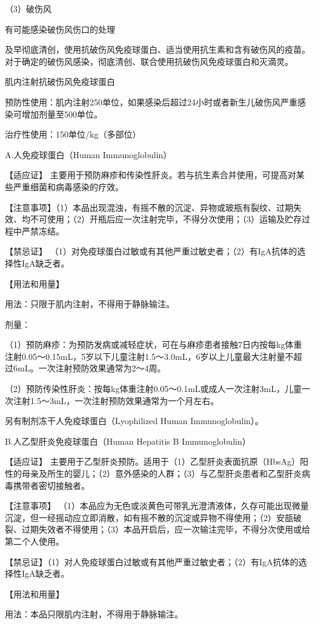 （3）破伤风

有可能感染破伤风伤口的处理

及早彻底清创，使用抗破伤风免疫球蛋白、适当使用抗生素和含有破伤风的疫苗。对于确定的破伤风感染，彻底清创、联合使用抗破伤风免疫球蛋白和灭滴灵。

肌内注射抗破伤风免疫球蛋白

预防性使用：肌内注射250单位，如果感染后超过24小时或者新生儿破伤风严重感染可增加剂量至500单位。

治疗性使用：150单位/kg（多部位）

A.人免疫球蛋白（Human Immunoglobulin）

【适应证】
主要用于预防麻疹和传染性肝炎。若与抗生素合并使用，可提高对某些严重细菌和病毒感染的疗效。

【注意事项】（1）本品出现混浊，有摇不散的沉淀、异物或玻瓶有裂纹、过期失效、均不可使用；（2）开瓶后应一次注射完毕，不得分次使用；（3）运输及贮存过程中严禁冻结。

【禁忌证】
（1）对免疫球蛋白过敏或有其他严重过敏史者；（2）有IgA抗体的选择性IgA缺乏者。

【用法和用量】

用法：只限于肌内注射，不得用于静脉输注。

剂量：

（1）预防麻疹：为预防发病或减轻症状，可在与麻疹患者接触7日内按每kg体重注射0.05～0.15mL，5岁以下儿童注射1.5～3.0mL，6岁以上儿童最大注射量不超过6mL。一次注射预防效果通常为2～4周。

（2）预防传染性肝炎：按每kg体重注射0.05～0.1mL或成人一次注射3mL，儿童一次注射1.5～3mL，一次注射预防效果通常为一个月左右。

另有制剂冻干人免疫球蛋白（Lyophilized Human Immunoglobulin）。

B.人乙型肝炎免疫球蛋白（Human Hepatitis B Immunoglobulin）

【适应证】
主要用于乙型肝炎预防。适用于（1）乙型肝炎表面抗原（HbsAg）阳性的母亲及所生的婴儿；（2）意外感染的人群；（3）与乙型肝炎患者和乙型肝炎病毒携带者密切接触者。

【注意事项】
（1）本品应为无色或淡黄色可带乳光澄清液体，久存可能出现微量沉淀，但一经摇动应立即消散，如有摇不散的沉淀或异物不得使用；（2）安瓿破裂、过期失效者不得使用；（3）本品开启后，应一次输注完毕，不得分次使用或给第二个人使用。

【禁忌证】（1）对人免疫球蛋白过敏或有其他严重过敏史者；（2）有IgA抗体的选择性IgA缺乏者。

【用法和用量】

用法：本品只限肌内注射，不得用于静脉输注。

